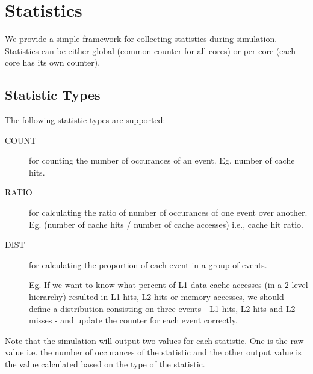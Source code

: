 

\chapter{Statistics}
\label{sec:stat}

We provide a simple framework for collecting statistics during simulation.
Statistics can be either global (common counter for all cores) or per core
(each core has its own counter).

\section{Statistic Types}

The following statistic types are supported:

\begin{description}

  \item [COUNT] for counting the number of occurances of an event. Eg. number
  of cache hits. 

  \item [RATIO] for calculating the ratio of number of occurances of one event
  over another. Eg. (number of cache hits / number of cache accesses) i.e.,
  cache hit ratio.

  \item [DIST]  for calculating the proportion of each event in a group of
  events.
    Eg. If we want to know what
  percent of L1 data cache accesses (in a 2-level hierarchy) resulted in L1
  hits, L2 hits or memory accesses, we should define a distribution consisting
  on three events - L1 hits, L2 hits and L2 misses  - and update the
  counter for each event correctly. 

\end{description}


Note that the simulation will output two values for each statistic. One is the
raw value i.e. the number of occurances of the statistic and the other output
value is the value calculated based on the type of the statistic.


